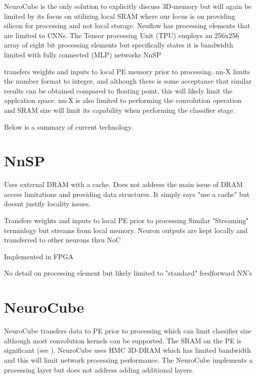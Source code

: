 {{%
\iftrue

\vspace{5mm}
NeuroCube\cite{kim2016neurocube} is the only solution to explicitly discuss 3D-memory but will again be limited by its focus on utilizing local SRAM where our focus is on
providing silicon for processing and not local storage.
Neuflow\cite{farabet2011neuflow} has processing elements that are limited to CNNs.
The Tensor processing Unit (TPU) \cite{jouppi2017datacenter} employs an 256x256 array of eight bit processing elements but specifically states it is bandwidth limited with fully connected (MLP) networks
NnSP{\cite{esmaeilzadeh2005nnsp} transfers weights and inputs to local PE memory prior to processing.
nn-X\cite{gokhale2014240} limits the number format to integer, and although there is some acceptance that similar
results can be obtained compared to floating point, this will likely limit the applcation space. 
nn-X is also limited to performing the convolution operation and SRAM size will limit its capability when performing the classifier stage.

Below is a summary of current technology.

\section[NnSP]{NnSP{\cite{esmaeilzadeh2005nnsp}}}

Uses external DRAM with a cache.
 Does not address the main issue of DRAM access limitations and providing data structures.
 It simply says "use a cache" but doesnt justify locality issues.

Transfers weights and inputs to local PE prior to processing
Similar "Streaming" terminlogy but streams from local memory.
Neuron outputs are kept locally and transferred to other neurons thru NoC

Implemented in FPGA

No detail on processing element but likely limited to "standard" feedforward NN's


\section[NeuroCube]{NeuroCube{\cite{kim2016neurocube}}}
NeuroCube\cite{kim2016neurocube} transfers data to PE prior to processing which can limit classifier size although most
convolution kernels can be supported.
The SRAM on the PE is significant (see ).
NeuroCube uses HMC 3D-DRAM which has limited bandwidth and this will limit network processing performance.
The NeuroCube implements a processing layer but does not address adding additional layers. 

}}}
